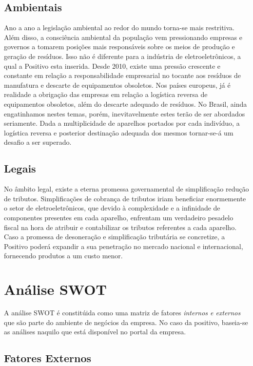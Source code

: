 {{{{\subsection{Ambientais}
Ano a ano a legislação ambiental ao redor do mundo torna-se mais restritiva. Além disso, a consciência ambiental da população vem pressionando empresas e governos a tomarem posições mais responsáveis sobre os meios de produção e geração de resíduos. Isso não é diferente para a indústria de eletroeletrônicos, a qual a Positivo esta inserida. Desde 2010, existe uma pressão crescente e constante em relação a responsabilidade empresarial no tocante aos resíduos de manufatura e descarte de equipamentos obsoletos. Nos países europeus, já é realidade a obrigação das empresas em relação a logística reversa de equipamentos obsoletos, além do descarte adequado de resíduos. No Brasil, ainda engatinhamos nestes temas, porém, inevitavelmente estes terão de ser abordados seriamente. Dada a multiplicidade de aparelhos portados por cada indivíduo, a logística reversa e posterior destinação adequada dos mesmos tornar-se-á um desafio a ser superado.

\subsection{Legais}
No âmbito legal, existe a eterna promessa governamental de simplificação redução de tributos. Simplificações de cobrança de tributos iriam beneficiar enormemente o setor de eletroeletrônicos, que devido à complexidade e a infinidade de componentes presentes em cada aparelho, enfrentam um verdadeiro pesadelo fiscal na hora de atribuir e contabilizar os tributos referentes a cada aparelho. Caso a promessa de desoneração e simplificação tributária se concretize, a Positivo poderá expandir a sua penetração no mercado nacional e internacional, fornecendo produtos a um custo menor.

\section{Análise SWOT}

A análise SWOT é constitúida como uma matriz de fatores \emph{internos e externos} que são parte do ambiente de negócios da empresa. No caso da positivo, baseia-se as análises naquilo que está disponível no portal da empresa\cite{fatoresDeRisco2018}\cite{positivo2t18}.

\subsection{Fatores Externos}

}}}}
